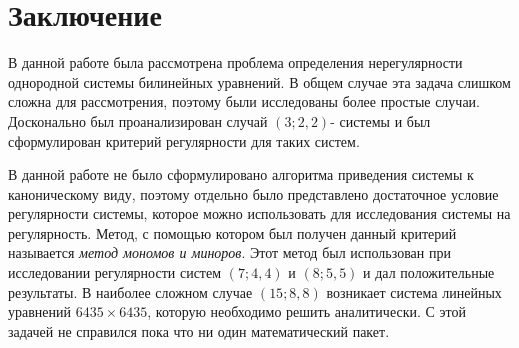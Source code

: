 \newpage
{}
\section*{Заключение}

В данной работе была рассмотрена проблема определения нерегулярности однородной системы 
билинейных уравнений. В общем случае эта задача слишком сложна для рассмотрения, поэтому 
были исследованы более простые случаи. Досконально был проанализирован случай $(3;2,2)$-
системы и был сформулирован критерий регулярности для таких систем. 

В данной работе не было сформулировано алгоритма приведения системы к каноническому виду, 
поэтому отдельно было представлено достаточное условие регулярности системы, которое можно 
использовать для исследования системы на регулярность. Метод, с помощью котором был получен 
данный критерий называется \textit{метод мономов и миноров}. Этот метод был использован при 
исследовании регулярности систем $(7; 4, 4)$ и $(8; 5, 5)$ и дал положительные результаты. В 
наиболее сложном случае $(15; 8, 8)$ возникает система линейных уравнений $6435 \times 
6435$, которую необходимо решить аналитически. С этой задачей не справился пока что ни один 
математический пакет.
\newpage
{}
\printbibliography







